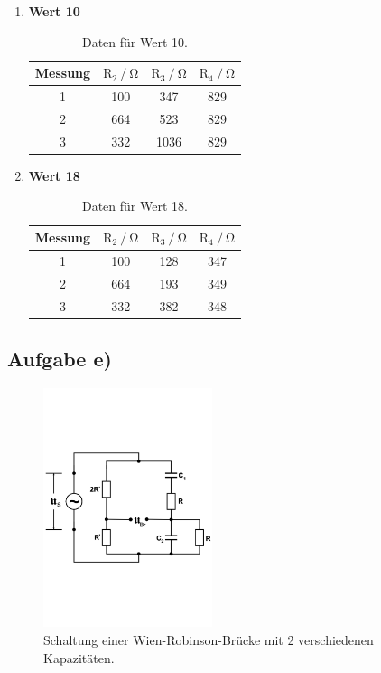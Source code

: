 \begin{enumerate}
\item \textbf{Wert 10}

\begin{table}
\centering
\begin{tabular}{c c c c }
\toprule
{Messung} &{$ \text{R}_2 \mathbin{/} \si{\ohm} $} & {$ \text{R}_3 \mathbin{/} \si{\ohm} $} & {$ \text{R}_4 \mathbin{/} \si{\ohm} $} \\
\midrule
1 & 100 & 347 & 829 \\
2 & 664 & 523 & 829 \\
3 & 332 & 1036 & 829 \\
\bottomrule
\end{tabular}
\caption{Daten für Wert 10.}
\label{tab:ad10}
\end{table}



\item \textbf{Wert 18}

\begin{table}
\centering
\begin{tabular}{c c c c }
\toprule
{Messung} & {$ \text{R}_2 \mathbin{/} \si{\ohm} $} & {$ \text{R}_3 \mathbin{/} \si{\ohm} $} & {$ \text{R}_4 \mathbin{/} \si{\ohm} $} \\
\midrule
1 & 100 & 128 & 347 \\
2 & 664 & 193 & 349 \\
3 & 332 & 382 & 348 \\
\bottomrule
\end{tabular}
\caption{Daten für Wert 18.}
\label{tab:ad18}
\end{table}

\end{enumerate}

\newpage
\subsection{Aufgabe e)}
\label{subsection:ae}

\begin{figure}
            \centering
               \includegraphics[height=7cm]{wiene.pdf}
               \caption{Schaltung einer Wien-Robinson-Brücke mit 2 verschiedenen Kapazitäten.}
               \label{fig:wiene}
        \end{figure}


